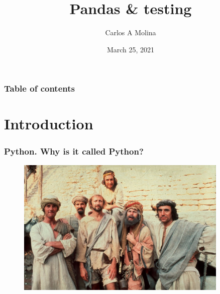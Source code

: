 \documentclass{beamer}
\title[Pandas \& testing]{Pandas \& testing} %
\author{Carlos A Molina}
\date{March 25, 2021}
\begin{document}
\begin{frame}
\titlepage %
\end{frame}

\begin{frame}
\frametitle{Table of contents}
\tableofcontents %
\end{frame}


\section{Introduction} %

\begin{frame}

\frametitle{Python. Why is it called Python?}

  \begin{figure}
    \centering
    \href{http://www.python.org/doc/faq/general/\#why-is-it-called-python}
      {\includegraphics[width=0.9\textwidth]{brian.jpeg}}
  \end{figure}

\end{frame}
\end{document}
